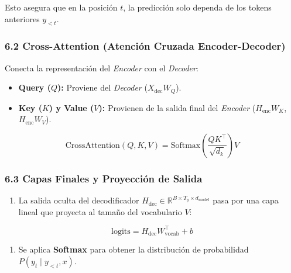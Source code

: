 \documentclass[11pt,oneside]{article}
\begin{document}
Esto asegura que en la posición \(t\), la predicción solo dependa de los tokens anteriores \(y_{<t}\).

\subsubsection{6.2 Cross-Attention (Atención Cruzada Encoder-Decoder)}

Conecta la representación del \emph{Encoder} con el \emph{Decoder}:

\begin{itemize}

\item \textbf{Query (\(Q\)):} Proviene del \emph{Decoder} (\(X_{\text{dec}} W_Q\)).

\end{itemize}

\begin{itemize}

\item \textbf{Key (\(K\)) y Value (\(V\)):} Provienen de la salida final del \emph{Encoder} (\(H_{\text{enc}} W_K\), \(H_{\text{enc}} W_V\)).

\end{itemize}

\[\text{CrossAttention}(Q, K, V) = \text{Softmax}\left( \frac{Q K^\top}{\sqrt{d_k}} \right) V\]

\subsubsection{6.3 Capas Finales y Proyección de Salida}

\begin{enumerate}

\item La salida oculta del decodificador \(H_{\text{dec}} \in \mathbb{R}^{B \times T_y \times d_{\text{model}}}\) pasa por una capa lineal que proyecta al tamaño del vocabulario \(V\):

\end{enumerate}

\[\text{logits} = H_{\text{dec}} W_{\text{vocab}}^\top + b\]

\begin{enumerate}

\item Se aplica \textbf{Softmax} para obtener la distribución de probabilidad \(P(y_t \mid y_{<t}, x)\).

\end{enumerate}
\end{document}
